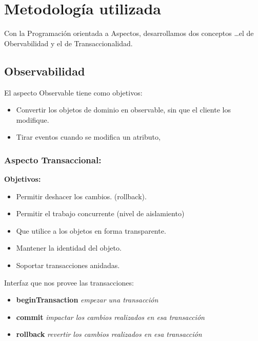 \section{Metodología utilizada}
\label{sec:Methodology}

Con la Programación orientada a Aspectos, desarrollamos dos conceptos \ldots el
de Obervabilidad y el de Transaccionalidad.

\subsection{ Observabilidad}
	El aspecto Observable tiene como objetivos:
	\begin{itemize}
	
	  \item Convertir los objetos de dominio en observable, sin que el cliente los
	  modifique.
	  
	  \item Tirar eventos cuando se modifica un atributo, 
	\end{itemize}

\subsubsection{Aspecto Transaccional:} 

	{\bf Objetivos:}
	\begin{itemize}

	  \item Permitir deshacer los cambios. (rollback).

	  \item Permitir el trabajo concurrente (nivel de aislamiento)
	  
	  \item Que utilice a los objetos en forma transparente.
	  
	  \item Mantener la identidad del objeto.
	  
	  \item Soportar transacciones anidadas.
	   
	\end{itemize} 
	
	Interfaz que nos provee las transacciones:
	\begin{itemize}
	  \item {\bf beginTransaction}  \emph{empezar una transacción}
	  \item {\bf commit} \emph{impactar los cambios realizados en esa transacción}
	  \item {\bf rollback} \emph{revertir los cambios realizados en esa
	  transacción}
	\end{itemize}


